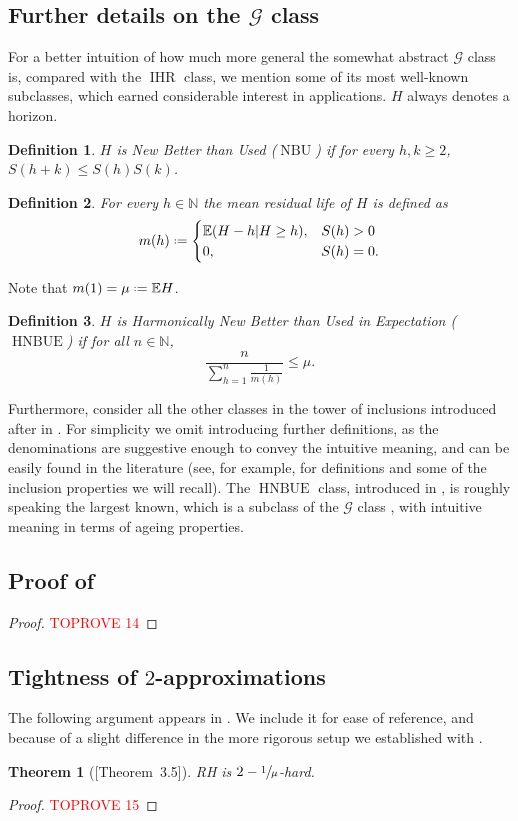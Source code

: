 \documentclass[11pt, a4paper, twoside]{article}
\newcommand*{\defeq}{\mathrel{\vcenter{\baselineskip0.5ex \lineskiplimit0pt
			\hbox{\scriptsize.}\hbox{\scriptsize.}}}=}
\newcommand{\NN}{\mathbb{N}}
\newcommand{\EE}{\mathbb{E}}
\newcommand{\PGF}{\mathcal{G}}
\DeclareMathOperator{\IHR}{IHR}
\DeclareMathOperator{\NBU}{NBU}
\DeclareMathOperator{\HNBUE}{HNBUE}
\newtheorem{theorem}{Theorem}[section]
\newtheorem{definition}{Definition}[section]
\numberwithin{equation}{section}
\begin{document}
	\subsection{Further details on the $\PGF$ class}\label{suppGclassdetails}
    For a better intuition of how much more general the somewhat abstract $\PGF$ class is, compared with the $\IHR$ class, we mention some of its most well-known subclasses, which earned considerable interest in applications. $H$ always denotes a horizon.
	\begin{definition}
		$H$ is \emph{New Better than Used ($\NBU$)} if for every $h,k\ge2$, $S(h+k)\le S(h)S(k)$.
	\end{definition}
	\begin{definition}
		For every $h\in\NN$ the \emph{mean residual life} of $H$ is defined as
		\[m(h)\defeq\begin{cases}
			\EE(H-h|H\ge h),&S(h)>0\\
			0,&S(h)=0.\end{cases}\]
	\end{definition}
	Note that $m(1)=\mu\defeq \EE H$.
	\begin{definition}\label{HNBUEdef}
		$H$ is \emph{Harmonically New Better than Used in Expectation ($\HNBUE$)} if for all $n\in\NN$, \[\frac{n}{\sum_{h=1}^n\frac{1}{m(h)}}\le \mu.\]
	\end{definition}
	Furthermore, consider all the other classes in the tower of inclusions introduced after  in . For simplicity we omit introducing further definitions, as the denominations are suggestive enough to convey the intuitive meaning, and can be easily found in the literature (see, for example, \cite{BraqRoyXie01} for definitions and some of the inclusion properties we will recall). The $\HNBUE$ class, introduced in \cite{Rol75}, is roughly speaking the largest known, which is a subclass of the $\PGF$ class \cite{Klef82}, with intuitive meaning in terms of ageing properties.


	\subsection{Proof of }\label{suppGclassgeomprice}
        \begin{proof}\textcolor{red}{TOPROVE 14}\end{proof}
	
	\subsection{Tightness of $2$-approximations}\label{suppGclasstight}
	The following argument appears in \cite[Theorem~3.5]{AliBanGolMunWan20}. We include it for ease of reference, and because of a slight difference in the more rigorous setup we established with .
        \begin{theorem}[{\cite{AliBanGolMunWan20}[Theorem~3.5]}]
		RH is $2-\sfrac{1}{\mu}$-hard.
	\end{theorem}
	\begin{proof}\textcolor{red}{TOPROVE 15}\end{proof}
 
\end{document}
